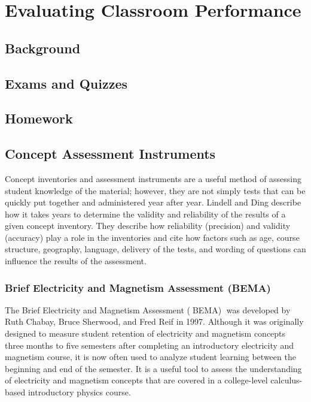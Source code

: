 

\chapter[Chapter 4: Evaluating Classroom Performance]{Evaluating Classroom Performance}

\section{Background}

\section{Exams and Quizzes}

\section{Homework}

\section{Concept Assessment Instruments}

Concept inventories and assessment instruments are a useful method of assessing student knowledge of the material; however, they are not simply tests that can be quickly put together and administered year after year. Lindell and Ding describe how it takes years to determine the validity and reliability of the results of a given concept inventory. They describe how reliability (precision) and validity (accuracy) play a role in the inventories and cite how factors such as age, course structure, geography, language, delivery of the tests, and wording of questions can influence the results of the assessment\cite{lindell2012}.

\subsection{Brief Electricity and Magnetism Assessment (BEMA)}

The Brief Electricity and Magnetism Assessment (􏰃BEMA)􏰄 was developed by Ruth Chabay, Bruce Sherwood, and Fred Reif in 1997. Although it was originally designed to measure student retention of electricity and magnetism concepts three months to five semesters after completing an introductory electricity and magnetism course, it is now often used to analyze student learning between the beginning and end of the semester. It is a useful tool to assess the understanding of electricity and magnetism concepts that are covered in a college-level calculus-based introductory physics course\cite{ding2006}.

